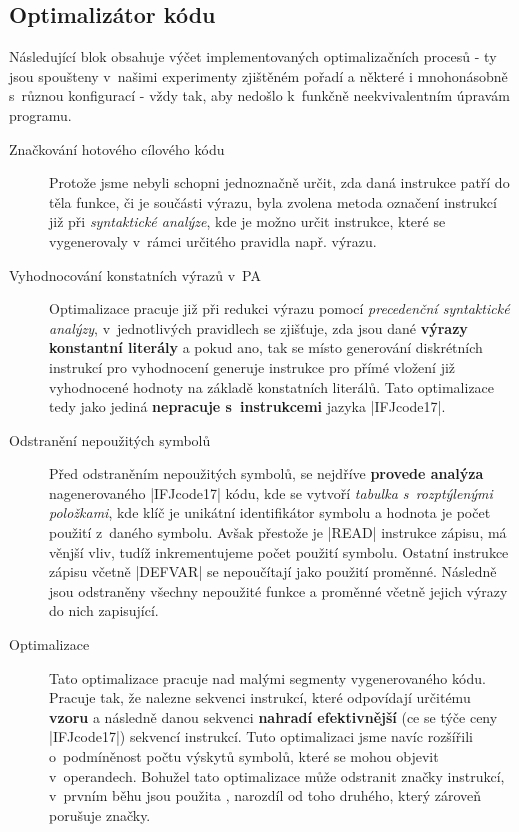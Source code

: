 \subsection{Optimalizátor kódu}
Následující blok obsahuje výčet implementovaných optimalizačních procesů - ty jsou spoušteny v~našimi experimenty zjištěném pořadí a některé i mnohonásobně s~různou konfigurací - vždy tak, aby nedošlo k~funkčně neekvivalentním úpravám programu. 

\begin{description}
    \item[Značkování hotového cílového kódu] Protože jsme nebyli schopni jednoznačně určit, zda daná instrukce patří do těla funkce, či je součásti výrazu, byla zvolena metoda označení instrukcí již při \emph{syntaktické analýze}, kde je možno určit instrukce, které se vygenerovaly v~rámci určitého pravidla např. výrazu.
    
    \item[Vyhodnocování konstatních výrazů v~PA]\label{subsec:optimization-cee} Optimalizace pracuje již při redukci výrazu pomocí \emph{precedenční syntaktické analýzy}, v~jednotlivých pravidlech se zjišťuje, zda jsou dané \textbf{výrazy konstantní literály} a pokud ano, tak se místo generování diskrétních instrukcí pro vyhodnocení generuje instrukce pro přímé vložení již vyhodnocené hodnoty na základě konstatních literálů. Tato optimalizace tedy jako jediná \textbf{nepracuje s~instrukcemi} jazyka \ic|IFJcode17|.
    
    \item[Odstranění nepoužitých symbolů] Před odstraněním nepoužitých symbolů, se nejdříve \textbf{provede analýza} nagenerovaného \ic|IFJcode17| kódu, kde se vytvoří \emph{tabulka s~rozptýlenými položkami}, kde klíč je unikátní identifikátor symbolu a hodnota je počet použití z~daného symbolu. Avšak přestože je \ic|READ| instrukce zápisu, má věnjší vliv, tudíž inkrementujeme počet použití symbolu. Ostatní instrukce zápisu včetně \ic|DEFVAR| se nepoučítají jako použití proměnné. Následně jsou odstraněny všechny nepoužité funkce a proměnné včetně jejich výrazy do nich zapisující.
    
    \item[Optimalizace ] Tato optimalizace pracuje nad malými segmenty vygenerovaného kódu. Pracuje tak, že nalezne sekvenci instrukcí, které odpovídají určitému \textbf{vzoru} a následně danou sekvenci \textbf{nahradí efektivnější} (ce se týče ceny \ic|IFJcode17|) sekvencí instrukcí. Tuto optimalizaci jsme navíc rozšířili o~podmíněnost počtu výskytů symbolů, které se mohou objevit v~operandech. Bohužel tato optimalizace může odstranit značky instrukcí, v~prvním běhu jsou použita , narozdíl od toho druhého, který zároveň porušuje značky.
    

\end{description}
